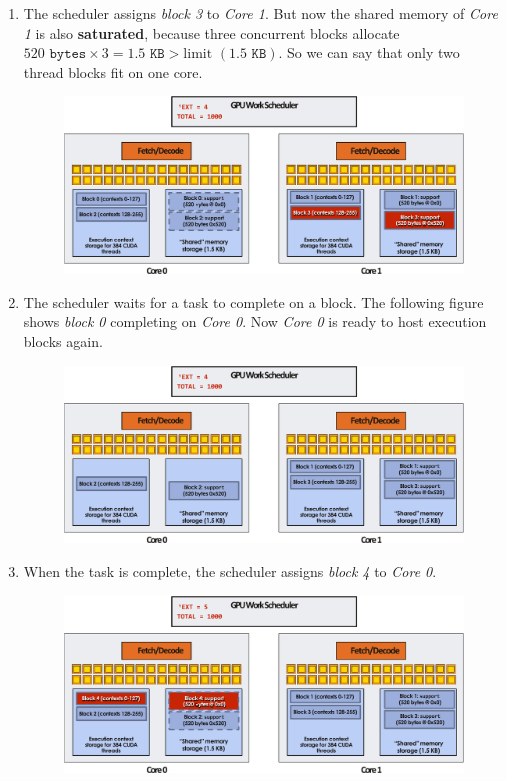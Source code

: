 \begin{enumerate}
    \item The scheduler assigns \emph{block 3} to \emph{Core 1}. But now the shared memory of \emph{Core 1} is also \textbf{saturated}, because three concurrent blocks allocate $520 \texttt{ bytes} \times 3 = 1.5 \texttt{ KB} > \text{limit } (1.5 \texttt{ KB})$. So we can say that only two thread blocks fit on one core.
    \begin{figure}[!htp]
        \centering
        \includegraphics[width=\textwidth]{img/cuda-convolve-kernel-5.pdf}
    \end{figure}

    \item The scheduler waits for a task to complete on a block. The following figure shows \emph{block 0} completing on \emph{Core 0}. Now \emph{Core 0} is ready to host execution blocks again.
    \begin{figure}[!htp]
        \centering
        \includegraphics[width=\textwidth]{img/cuda-convolve-kernel-6.pdf}
    \end{figure}

    \newpage

    \item When the task is complete, the scheduler assigns \emph{block 4} to \emph{Core 0}.
    \begin{figure}[!htp]
        \centering
        \includegraphics[width=\textwidth]{img/cuda-convolve-kernel-7.pdf}
    \end{figure}


\end{enumerate}
